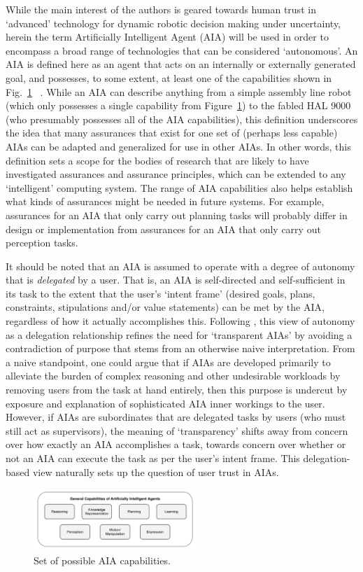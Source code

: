     While the main interest of the authors is geared towards human trust in `advanced' technology for dynamic robotic decision making under uncertainty, herein the term Artificially Intelligent Agent (AIA) will be used in order to encompass a broad range of technologies that can be considered `autonomous'.
    An AIA is defined here as an agent that acts on an internally or externally generated goal, and possesses, to some extent, at least one of the capabilities shown in Fig.~\ref{fig:AIcapabilities} ~\cite{Russell2010-wv,Nilsson2009-rp,Luger2008-vf}. 
    While an AIA can describe anything from a simple assembly line robot (which only possesses a single capability from Figure~\ref{fig:AIcapabilities}) to the fabled HAL 9000 (who presumably possesses all of the AIA capabilities), this definition underscores the idea that many assurances that exist for one set of (perhaps less capable) AIAs can be adapted and generalized for use in other AIAs.
    In other words, this definition sets a scope for the bodies of research that are likely to have investigated assurances and assurance principles, which can be extended to any `intelligent' computing system. 
    The range of AIA capabilities also helps establish what kinds of assurances might be needed in future systems. 
    For example, assurances for an AIA that only carry out planning tasks will probably differ in design or implementation from assurances for an AIA that only carry out perception tasks. 
    
    It should be noted that an AIA is assumed to operate with a degree of autonomy that is \emph{delegated} by a user. That is, an AIA is self-directed and self-sufficient in its task to the extent that the user's `intent frame' (desired goals, plans, constraints, stipulations and/or value statements) can be met by the AIA, regardless of how it actually accomplishes this. %
    Following \citet{Miller2014-av}, this view of autonomy as a delegation relationship refines the need for `transparent AIAs' by avoiding a contradiction of purpose that stems from an otherwise naive interpretation. From a naive standpoint, one could argue that if AIAs are developed primarily to alleviate the burden of complex reasoning and other undesirable workloads by removing users from the task at hand entirely, then this purpose is undercut by exposure and explanation of sophisticated AIA inner workings to the user. 
    However, if AIAs are subordinates that are delegated tasks by users (who must still act as supervisors), the meaning of `transparency' shifts away from concern over how exactly an AIA accomplishes a task, towards concern over whether or not an AIA can execute the task as per the user's intent frame. 
    This delegation-based view naturally sets up the question of user trust in AIAs. 

	\begin{figure}[t!]%
    	\centering
     	\includegraphics[width=0.55\textwidth]{Figures/AI_capabilities}
    	\caption{Set of possible AIA capabilities.}
        \label{fig:AIcapabilities}
    \end{figure}
